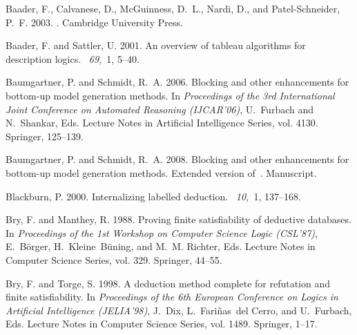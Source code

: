 \documentclass[leqno
,pdflatex
,prodmode
,acmtocl
]{acmsmall}
\begin{document}
\begin{thebibliography}{}

{\sc Baader, F.}, {\sc Calvanese, D.}, {\sc McGuinness, D.~L.}, {\sc Nardi,
  D.}, {\sc and} {\sc Patel-Schneider, P.~F.} 2003.
.
\newblock Cambridge University Press.

{\sc Baader, F.} {\sc and} {\sc Sattler, U.} 2001.
\newblock An overview of tableau algorithms for description logics.
~{\em 69,\/}~1, 5--40.

{\sc Baumgartner, P.} {\sc and} {\sc Schmidt, R.~A.} 2006.
\newblock Blocking and other enhancements for bottom-up model generation
  methods.
\newblock In {\em Proceedings of the 3rd International Joint Conference on
  Automated Reasoning ({IJCAR}'06)}, {U.~Furbach} {and} {N.~Shankar}, Eds.
  Lecture Notes in Artificial Intelligence Series, vol. 4130. Springer,
  125--139.

{\sc Baumgartner, P.} {\sc and} {\sc Schmidt, R.~A.} 2008.
\newblock Blocking and other enhancements for bottom-up model generation
  methods.
\newblock Extended version of~\cite{BaumgartnerSchmidt06}. Manuscript.

{\sc Blackburn, P.} 2000.
\newblock Internalizing labelled deduction.
~{\em 10,\/}~1, 137--168.

{\sc Bry, F.} {\sc and} {\sc Manthey, R.} 1988.
\newblock Proving finite satisfiability of deductive databases.
\newblock In {\em Proceedings of the 1st Workshop on Computer Science Logic
  ({CSL}'87)}, {E.~B{\"o}rger}, {H.~Kleine~B{\"u}ning}, {and} {M.~M. Richter},
  Eds. Lecture Notes in Computer Science Series, vol. 329. Springer, 44--55.

{\sc Bry, F.} {\sc and} {\sc Torge, S.} 1998.
\newblock A deduction method complete for refutation and finite satisfiability.
\newblock In {\em Proceedings of the 6th European Conference on Logics in
  Artificial Intelligence ({JELIA}'98)}, {J.~Dix}, {L.~Fari{\~n}as~del Cerro},
  {and} {U.~Furbach}, Eds. Lecture Notes in Computer Science Series, vol. 1489.
  Springer, 1--17.


\end{thebibliography}
\end{document}
